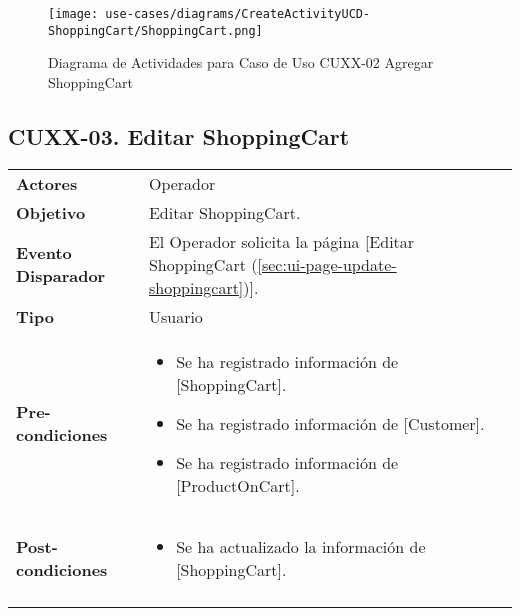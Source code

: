 	\begin{figure}[H]
		\begin{center}
			\label{tab:activity-create-ucd-entity-shoppingcart}
			\texttt{[image: use-cases/diagrams/CreateActivityUCD-ShoppingCart/ShoppingCart.png]}
			\caption{Diagrama de Actividades para Caso de Uso CUXX-02 Agregar ShoppingCart}	
	    \end{center}
	\end{figure}
			
	
	\clearpage
	\subsection{CUXX-03. Editar ShoppingCart} \label{sec:cu-update-ShoppingCart}
	
	\begin{tabular}{ p{3.5cm} p{11.5cm} }
		\textbf{Actores} & Operador\\
		\textbf{Objetivo} & Editar ShoppingCart.\\
		\textbf{Evento Disparador} & El Operador solicita la p\'agina [Editar ShoppingCart (\ref{sec:ui-page-update-shoppingcart})].\\
		\textbf{Tipo} & Usuario\\
		\textbf{Pre-condiciones} &
			\begin{minipage}[t]{0.6\textwidth}
			\begin{itemize}[noitemsep,nolistsep]
			\setlength{\itemindent}{-.5cm}
				\item Se ha registrado informaci\'on de [ShoppingCart].
				\item Se ha registrado informaci\'on de [Customer].
				\item Se ha registrado informaci\'on de [ProductOnCart].
			\end{itemize}
			\end{minipage} \\
		\textbf{Post-condiciones} &
			\begin{minipage}[t]{0.6\textwidth}
			\begin{itemize}[noitemsep,nolistsep]
			\setlength{\itemindent}{-.5cm}
				\item Se ha actualizado la informaci\'on de [ShoppingCart].
			\end{itemize}
			\end{minipage} \\
		\\
	\end{tabular}
	
